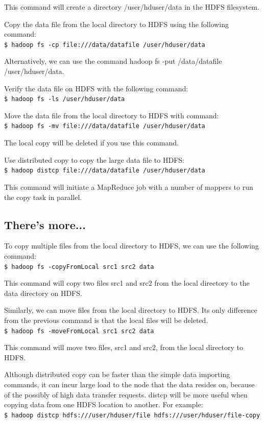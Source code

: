 This command will create a directory /user/hduser/data in the HDFS filesystem.

Copy the data file from the local directory to HDFS using the following command: \\
\verb|$ hadoop fs -cp file:///data/datafile /user/hduser/data|

Alternatively, we can use the command hadoop fs -put /data/datafile /user/hduser/data.

Verify the data file on HDFS with the following command: \\
\verb|$ hadoop fs -ls /user/hduser/data|

Move the data file from the local directory to HDFS with command: \\
\verb|$ hadoop fs -mv file:///data/datafile /user/hduser/data|

The local copy will be deleted if you use this command.

Use distributed copy to copy the large data file to HDFS: \\
\verb|$ hadoop distcp file:///data/datafile /user/hduser/data |

This command will initiate a MapReduce job with a number of mappers to run the copy task in parallel.

\subsection*{There's more...}
To copy multiple files from the local directory to HDFS, we can use the following command: \\
\verb|$ hadoop fs -copyFromLocal src1 src2 data|

This command will copy two files src1 and src2 from the local directory to the data directory on HDFS.

Similarly, we can move files from the local directory to HDFS. Its only difference from the previous command is that the local files will be deleted. \\
\verb|$ hadoop fs -moveFromLocal src1 src2 data|

This command will move two files, src1 and src2, from the local directory to HDFS.

Although distributed copy can be faster than the simple data importing commands, it can incur large load to the node that the data resides on, because of the possibly of high data transfer requests. distcp will be more useful when copying data from one HDFS location to another. For example: \\
\verb|$ hadoop distcp hdfs:///user/hduser/file hdfs:///user/hduser/file-copy|

